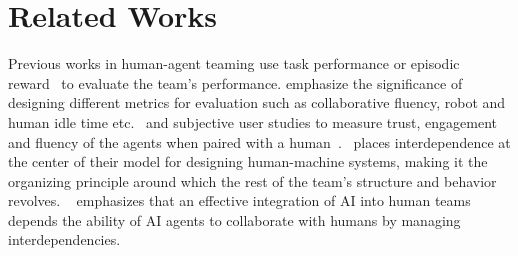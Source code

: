 \section{Related Works}
Previous works in human-agent teaming use task performance or episodic reward~\cite{fcp,hsp,mep,cole,zsceval,metric1} to evaluate the team's performance. \cite{metric3,metric6,metric7} emphasize the significance of designing different metrics for evaluation
such as collaborative fluency, robot and human idle time etc.~\cite{metric3} and subjective user studies to measure trust, engagement and fluency of the agents when paired with a human~\cite{metric3,metric4,metric5}.~\cite{int5} places interdependence at the center of their model for designing human-machine systems, making it the organizing principle around which the rest of the team's structure and behavior revolves.
~\cite{int1} emphasizes that an effective integration of AI into human teams depends the ability of AI agents to collaborate with humans by managing interdependencies.